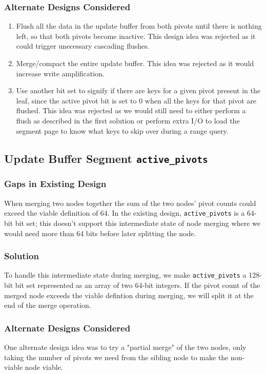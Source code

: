 \documentclass[11pt]{article}
\begin{document}
\subsubsection{Alternate Designs Considered}
\begin{enumerate}
    \item Flush all the data in the update buffer from both pivots until there is nothing left, so that both pivots become inactive. This design idea was rejected as it could trigger unecessary cascading flushes.
    \item Merge/compact the entire update buffer. This idea was rejected as it would increase write amplification.
    \item Use another bit set to signify if there are keys for a given pivot present in the leaf, since the active pivot bit is set to 0 when all the keys for that pivot are flushed. This idea was rejected as we would still need to either perform a flush as described in the first solution or perform extra I/O to load the segment page to know what keys to skip over during a range query.
\end{enumerate}

\subsection{Update Buffer Segment \texttt{active\_pivots}}

\subsubsection{Gaps in Existing Design}
When merging two nodes together the sum of the two nodes' pivot counts could exceed the viable definition of 64. In the existing design, \texttt{active\_pivots} is a 64-bit bit set; this doesn't support this intermediate state of node merging where we would need more than 64 bits before later splitting the node.

\subsubsection{Solution}
To handle this intermediate state during merging, we make \texttt{active\_pivots} a 128-bit bit set represented as an array of two 64-bit integers. If the pivot count of the merged node exceeds the viable defintion during merging, we will split it at the end of the merge operation.

\subsubsection{Alternate Designs Considered}
One alternate design idea was to try a "partial merge" of the two nodes, only taking the number of pivots we need from the sibling node to make the non-viable node viable.
\end{document}
